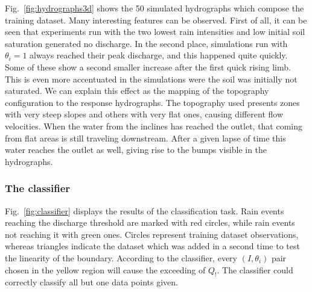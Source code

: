 Fig.~\ref{fig:hydrographs3d} shows the \num{50} simulated hydrographs which compose the training dataset.
Many interesting features can be observed.
First of all, it can be seen that experiments run with the two lowest rain intensities and low initial soil saturation generated no discharge.
In the second place, simulations run with $\theta_i = \num{1}$ always reached their peak discharge, and this happened quite quickly.
Some of these show a second smaller increase after the first quick rising limb.
This is even more accentuated in the simulations were the soil was initially not saturated.
We can explain this effect as the mapping of the topography configuration to the response hydrographs.
The topography used presents zones with very steep slopes and others with very flat ones, causing different flow velocities.
When the water from the inclines has reached the outlet, that coming from flat areas is still traveling downstream.
After a given lapse of time this water reaches the outlet as well, giving rise to the bumps visible in the hydrographs.\\

\subsubsection{The classifier}\label{sec:classifier}

Fig.~\ref{fig:classifier} displays the results of the classification task.
Rain events reaching the discharge threshold are marked with red circles, while rain events not reaching it with green ones. Circles represent training dataset observations, whereas triangles indicate the dataset which was added in a second time to test the linearity of the boundary.
According to the classifier, every $(I, \theta_i)$ pair chosen in the yellow region will cause the exceeding of $Q_!$. The classifier could correctly classify all but one data points given.

